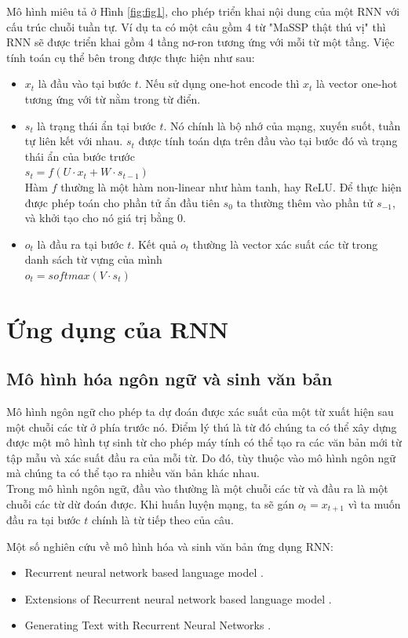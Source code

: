 \documentclass[12pt]{extarticle}
\newcommand{\<}{\langle}
\renewcommand{\>}{\rangle}
\theoremstyle{definition}
\begin{document}
Mô hình miêu tả ở Hình \ref{fig:fig1}, cho phép triển khai nội dung của một RNN với cấu trúc chuỗi tuần tự. Ví dụ ta có một câu gồm 4 từ "MaSSP thật thú vị" thì RNN sẽ được triển khai gồm 4 tầng nơ-ron tương ứng với mỗi từ một tầng. Việc tính toán cụ thể bên trong được thực hiện như sau:
\begin{itemize}
    \item $x_t$ là đầu vào tại bước $t$. Nếu sử dụng one-hot encode thì $x_t$ là vector one-hot tương ứng với từ nằm trong từ điển.
    \item $s_t$ là trạng thái ẩn tại bước $t$. Nó chính là bộ nhớ của mạng, xuyến suốt, tuần tự liên kết với nhau. $s_t$ được tính toán dựa trên đầu vào tại bước đó và trạng thái ẩn của bước trước\\
    $s_t = f(U \cdot x_t + W \cdot s_{t-1})$\\
    Hàm $f$ thường là một hàm non-linear như hàm tanh, hay ReLU. Để thực hiện được phép toán cho phần tử ẩn đầu tiên $s_0$ ta thường thêm vào phần tử $s_{-1}$, và khởi tạo cho nó giá trị bằng 0.
    \item $o_t$ là đầu ra tại bước $t$. Kết quả $o_t$ thường là vector xác suất các từ trong danh sách từ vựng của mình\\
    $o_t = softmax(V \cdot s_t)$
    
\end{itemize}

\section{Ứng dụng của RNN}
\subsection{Mô hình hóa ngôn ngữ và sinh văn bản}

Mô hình ngôn ngữ cho phép ta dự đoán được xác suất của một từ xuất hiện sau một chuỗi các từ ở phía trước nó. Điểm lý thú là từ đó chúng ta có thể xây dựng được một mô hình tự sinh từ cho phép máy tính có thể tạo ra các văn bản mới từ tập mẫu và xác suất đầu ra của mỗi từ. Do đó, tùy thuộc vào mô hình ngôn ngữ mà chúng ta có thể tạo ra nhiều văn bản khác nhau. \\
Trong mô hình ngôn ngữ, đầu vào thường là một chuỗi các từ và đầu ra là một chuỗi các từ dừ đoán được. Khi huấn luyện mạng, ta sẽ gán $o_t = x_{t+1}$ vì ta muốn đầu ra tại bước $t$ chính là từ tiếp theo của câu.

Một số nghiên cứu về mô hình hóa và sinh văn bản ứng dụng RNN:
\begin{itemize}
    \item Recurrent neural network based language model \cite{mikolov10}.
    \item Extensions of Recurrent neural network based language model \cite{mikolov11}.
    \item Generating Text with Recurrent Neural Networks \cite{sutskever11}.
\end{itemize}
\end{document}
